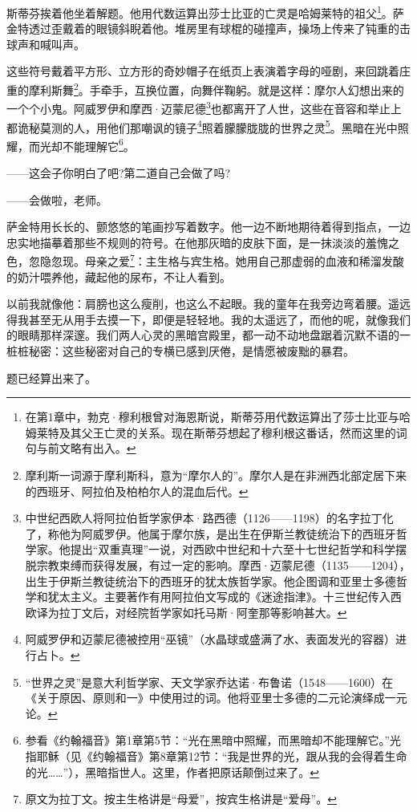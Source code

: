 \par 斯蒂芬挨着他坐着解题。他用代数运算出莎士比亚的亡灵是哈姆莱特的祖父\footnote{在第1章中，勃克·穆利根曾对海恩斯说，斯蒂芬用代数运算出了莎士比亚与哈姆莱特及其父王亡灵的关系。现在斯蒂芬想起了穆利根这番话，然而这里的词句与前文略有出入。}。萨金特透过歪戴着的眼镜斜睨着他。堆房里有球棍的碰撞声，操场上传来了钝重的击球声和喊叫声。
\par 这些符号戴着平方形、立方形的奇妙帽子在纸页上表演着字母的哑剧，来回跳着庄重的摩利斯舞\footnote{摩利斯一词源于摩利斯科，意为“摩尔人的”。摩尔人是在非洲西北部定居下来的西班牙、阿拉伯及柏柏尔人的混血后代。}。手牵手，互换位置，向舞伴鞠躬。就是这样：摩尔人幻想出来的一个个小鬼。阿威罗伊和摩西·迈蒙尼德\footnote{中世纪西欧人将阿拉伯哲学家伊本·路西德（1126——1198）的名字拉丁化了，称他为阿威罗伊。他属于摩尔族，是出生在伊斯兰教徒统治下的西班牙哲学家。他提出“双重真理”一说，对西欧中世纪和十六至十七世纪哲学和科学摆脱宗教束缚而获得发展，有过一定的影响。摩西·迈蒙尼德（1135——1204），出生于伊斯兰教徒统治下的西班牙的犹太族哲学家。他企图调和亚里士多德哲学和犹太主义。主要著作有用阿拉伯文写成的《迷途指津》。十三世纪传入西欧译为拉丁文后，对经院哲学家如托马斯·阿奎那等影响甚大。}也都离开了人世，这些在音容和举止上都诡秘莫测的人，用他们那嘲讽的镜子\footnote{阿威罗伊和迈蒙尼德被控用“巫镜”（水晶球或盛满了水、表面发光的容器）进行占卜。}照着朦朦胧胧的世界之灵\footnote{“世界之灵”是意大利哲学家、天文学家乔达诺·布鲁诺（1548——1600）在《关于原因、原则和一》中使用过的词。他将亚里士多德的二元论演绎成一元论。}。黑暗在光中照耀，而光却不能理解它\footnote{参看《约翰福音》第1章第5节：“光在黑暗中照耀，而黑暗却不能理解它。”光指耶稣（见《约翰福音》第8章第12节：“我是世界的光，跟从我的会得着生命的光……”），黑暗指世人。这里，作者把原话颠倒过来了。}。
\par ——这会子你明白了吧?第二道自己会做了吗?
\par ——会做啦，老师。
\par 萨金特用长长的、颤悠悠的笔画抄写着数字。他一边不断地期待着得到指点，一边忠实地描摹着那些不规则的符号。在他那灰暗的皮肤下面，是一抹淡淡的羞愧之色，忽隐忽现。母亲之爱\footnote{原文为拉丁文。按主生格讲是“母爱”，按宾生格讲是“爱母”。}：主生格与宾生格。她用自己那虚弱的血液和稀溜发酸的奶汁喂养他，藏起他的尿布，不让人看到。
\par 以前我就像他：肩膀也这么瘦削，也这么不起眼。我的童年在我旁边弯着腰。遥远得我甚至无从用手去摸一下，即便是轻轻地。我的太遥远了，而他的呢，就像我们的眼睛那样深邃。我们两人心灵的黑暗宫殿里，都一动不动地盘踞着沉默不语的一桩桩秘密：这些秘密对自己的专横已感到厌倦，是情愿被废黜的暴君。
\par 题已经算出来了。
